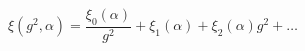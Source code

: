 \begin{equation}  \label{d4}
\xi(g^{2},\alpha)=\frac{\xi_{0}(\alpha)}{g^{2}}+\xi_{1}(\alpha)+\xi_{2}(%
\alpha)g^{2}+\ldots
\end{equation}

